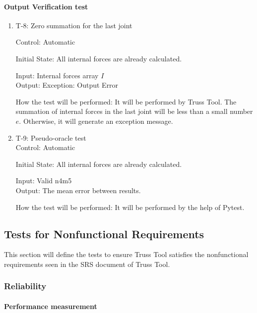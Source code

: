 \documentclass[12pt, titlepage]{article}
\begin{document}
\paragraph{Output Verification test}

\begin{enumerate}

\item{T-8: Zero summation for the last joint\\}

Control: Automatic
					
Initial State: All internal forces are already calculated.
					
Input: Internal forces array $I$\\
					
Output: Exception: Output Error
					
How the test will be performed: It will be performed by Truss Tool. The summation of internal forces in the last joint will be less than a small number $e$. Otherwise, it will generate an exception message.
\item{T-9: Pseudo-oracle test\\}
Control: Automatic
					
Initial State: All internal forces are already calculated.
					
Input: Valid n4m5 \\
					
Output:  The mean error between results.
					
How the test will be performed: It will be performed by the help of Pytest.

\end{enumerate}

\subsection{Tests for Nonfunctional Requirements}
This section will define the tests to ensure Truss Tool satisfies the nonfunctional requirements seen in the SRS document of Truss Tool. 
\subsubsection{Reliability}


		
\paragraph{Performance measurement}
\end{document}

